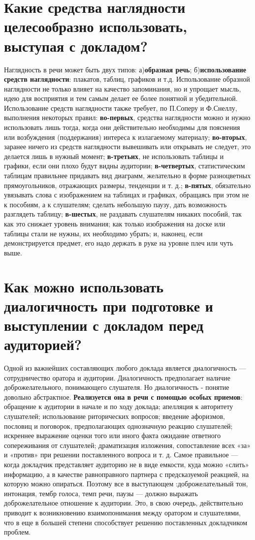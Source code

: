 \chapter{\textbf{Какие средства наглядности целесообразно использовать, выступая с докладом?}}
Наглядность в речи может быть двух типов: а)\textbf{образная речь}; б)\textbf{использование средств наглядности}: плакатов, таблиц, графиков и т.д. Использование образной наглядности не только влияет на качество запоминания, но и упрощает мысль, идею для восприятия и тем самым делает ее более понятной и убедительной. Использование средств наглядности также требует, по П.Соперу и Ф.Снеллу, выполнения некоторых правил: \textbf{во-первых}, средства наглядности можно и нужно использовать лишь тогда, когда они действительно необходимы для пояснения или возбуждения (поддержания) интереса к излагаемому материалу; \textbf{во-вторых}, заранее ничего из средств наглядности вывешивать или открывать не следует, это делается лишь в нужный момент; \textbf{в-третьих}, не использовать таблицы и графики, если они плохо будут видны аудитории; \textbf{в-четвертых}, статистическим таблицам правильнее придавать вид диаграмм, желательно в форме разноцветных прямоугольников, отражающих размеры, тенденции и т. д.; \textbf{в-пятых}, обязательно увязывать слова с изображением на таблицах и графиках, обращаясь при этом не к пособиям, а к слушателям; сделать небольшую паузу, дать возможность разглядеть таблицу; \textbf{в-шестых}, не раздавать слушателям никаких пособий, так как это снижает уровень внимания; как только изображения на доске или таблицы стали не нужны, их необходимо убрать; и, наконец, если демонстрируется предмет, его надо держать в руке на уровне плеч или чуть выше. 

\chapter{\textbf{Как можно использовать диалогичность при подготовке и выступлении с докладом перед аудиторией?}}
Одной из важнейших составляющих любого доклада является диалогичность — сотрудничество оратора и аудитории. Диалогичность предполагает наличие доброжелательного, понимающего слушателя. Но диалогичность - понятие довольно абстрактное. \textbf{Реализуется она в речи с помощью особых приемов}: обращение к аудитории в начале и по ходу доклада; апелляция к авторитету слушателей; использование риторических вопросов; введение афоризмов, пословиц и поговорок, предполагающих однозначную реакцию слушателей; искреннее выражение оценки того или иного факта ожидание ответного сопереживания от слушателей; драматизация изложения, сопоставление всех «за» и «против» при решении поставленного вопроса и т. д. Самое правильное — когда докладчик представляет аудиторию не в виде емкости, куда можно «слить» информацию, а в качестве равноправного партнера с предсказуемой реакцией, на которую можно опираться. Поэтому все в выступающем :доброжелательный тон, интонация, тембр голоса, темп речи, паузы — должно выражать доброжелательное отношение к аудитории. Это, в свою очередь, действительно приводит к возникновению взаимопонимания между оратором и слушателями, что в еще в большей степени способствует решению поставленных докладчиком проблем.